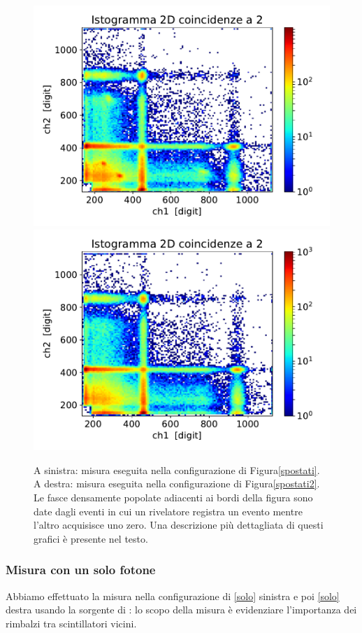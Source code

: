 \begin{figure}[h]
\centering
\hspace{-2.5 cm}
\subfloat
{
\includegraphics[width=21 em]{immagini/0518_rimbalzi}
\label{spostato}
}
\subfloat
{
\includegraphics[width=21 em]{immagini/0518_piombo}
\label{piombo}
}
\caption{A sinistra: misura eseguita nella configurazione di Figura\autoref{spostati}. \\
A destra: misura eseguita nella configurazione di Figura\autoref{spostati2}.  \\
Le fasce densamente popolate adiacenti ai bordi della figura sono date dagli eventi in cui un rivelatore registra un evento mentre l'altro acquisisce uno zero.
Una descrizione più dettagliata di questi grafici è presente nel testo.}

\end{figure}

\subsubsection{Misura con un solo fotone}

Abbiamo effettuato la misura nella configurazione di \autoref{solo} sinistra e poi \autoref{solo} destra usando la sorgente di \cs{}: lo scopo della misura è evidenziare l'importanza dei rimbalzi tra scintillatori vicini.

